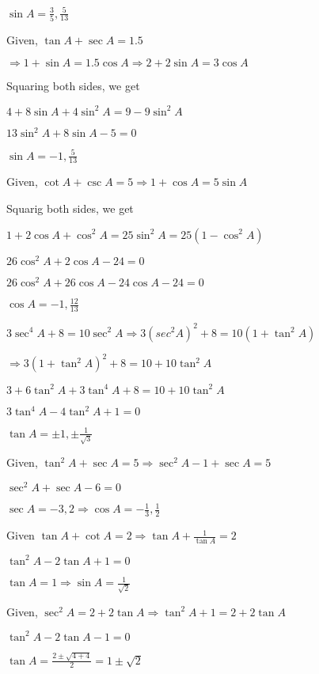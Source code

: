     $\sin A = \frac{3}{5}, \frac{5}{13}$

\item Given, $\tan A + \sec A = 1.5$

    $\Rightarrow 1 + \sin A = 1.5 \cos A \Rightarrow 2 + 2\sin A = 3\cos A$

    Squaring both sides, we get

    $4 + 8\sin A + 4\sin^2A = 9 - 9\sin^2A$

    $13\sin^2A + 8\sin A - 5 =0$

    $\sin A = -1, \frac{5}{13}$

\item Given, $\cot A + \csc A = 5 \Rightarrow 1 + \cos A = 5\sin A$

    Squarig both sides, we get

    $1 + 2\cos A + \cos^2A = 25\sin^2A = 25(1 - \cos^2A)$

    $26\cos^2A + 2\cos A - 24 = 0$

    $26\cos^2A + 26\cos A - 24\cos A - 24 = 0$

    $\cos A= -1, \frac{12}{13}$

\item $3\sec^4 A + 8 = 10\sec^2A \Rightarrow 3(sec^2A)^2 + 8 = 10(1 + \tan^2A)$

    $\Rightarrow 3(1 + \tan^2A)^2 + 8 = 10 + 10\tan^2A$

    $3 + 6\tan^2A + 3\tan^4A + 8 = 10 + 10\tan^2A$

    $3\tan^4A - 4\tan^2A + 1 = 0$

    $\tan A = \pm1, \pm\frac{1}{\sqrt{3}}$

\item Given, $\tan^2A + \sec A = 5 \Rightarrow \sec^2A - 1 + \sec A = 5$

    $\sec^2A + \sec A - 6 = 0$

    $\sec A = -3, 2\Rightarrow \cos A = -\frac{1}{3}, \frac{1}{2}$

\item Given $\tan A + \cot A = 2 \Rightarrow \tan A + \frac{1}{\tan A} = 2$

    $\tan^2A - 2\tan A + 1 = 0$

    $\tan A = 1 \Rightarrow \sin A = \frac{1}{\sqrt{2}}$

\item Given, $\sec^2A = 2 + 2\tan A \Rightarrow \tan^2A + 1 = 2 + 2\tan A$

    $\tan^2A - 2\tan A - 1 = 0$

    $\tan A = \frac{2 \pm \sqrt{4 + 4}}{2} = 1 \pm \sqrt{2}$

